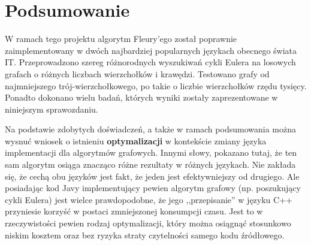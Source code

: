 \section{Podsumowanie}

W ramach tego projektu algorytm Fleury'ego został poprawnie zaimplementowany w dwóch najbardziej popularnych językach obecnego świata IT.
Przeprowadzono szereg różnorodnych wyszukiwań cykli Eulera na losowych grafach o różnych liczbach wierzchołków i krawędzi.
Testowano grafy od najmniejszego trój-wierzchołkowego, po takie o liczbie wierzchołków rzędu tysięcy.
Ponadto dokonano wielu badań, których wyniki zostały zaprezentowane w niniejszym sprawozdaniu.

Na podstawie zdobytych doświadczeń, a także w ramach podsumowania można wysnuć wniosek o istnieniu \textbf{optymalizacji} w kontekście zmiany języka implementacji dla algorytmów grafowych.
Innymi słowy, pokazano tutaj, że ten sam algorytm osiąga znacząco różne rezultaty w różnych językach.
Nie zakłada się, że cechą obu języków jest fakt, że jeden jest efektywniejszy od drugiego.
Ale posiadając kod Javy implementujący pewien algorytm grafowy (np. poszukujący cykli Eulera) jest wielce prawdopodobne, że jego ,,przepisanie'' w języku C++ przyniesie korzyść w postaci zmniejszonej konsumpcji czasu.
Jest to w rzeczywistości pewien rodzaj optymalizacji, który można osiągnąć stosunkowo niskim kosztem oraz bez ryzyka straty czytelności samego kodu źródłowego.

